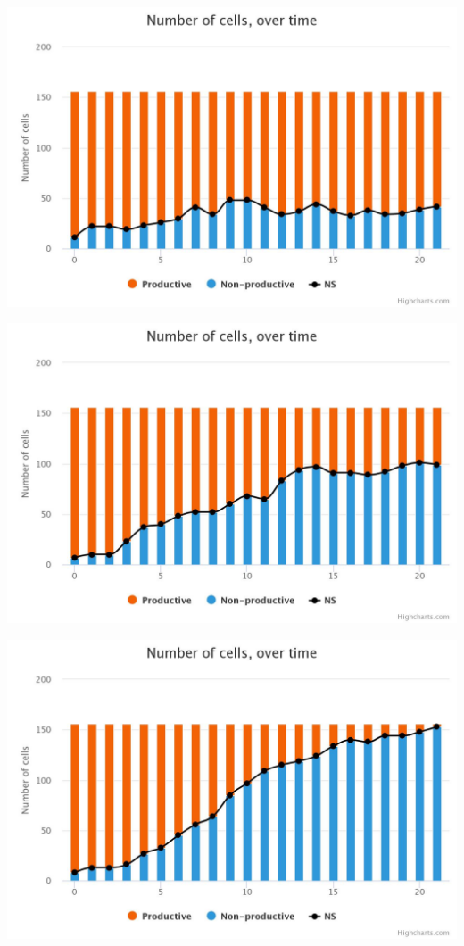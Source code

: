 \begin{minipage}{\linewidth}
	\centering
	\begin{multicols}{3}
		\begin{Figure}
			\centering
			\includegraphics[width=\linewidth]{images/chart001.jpeg}
		\end{Figure}
		\begin{Figure}
			\centering
			\includegraphics[width=\linewidth]{images/chart01.jpeg}
		\end{Figure}
		\begin{Figure}
			\centering
			\includegraphics[width=\linewidth]{images/chart08.jpeg}

\end{Figure}
\end{multicols}
\end{minipage}
